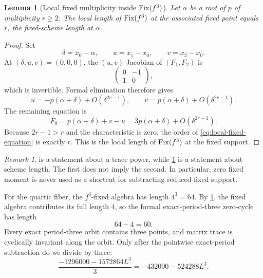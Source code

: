 \documentclass[11pt]{article}
\newtheorem{lemma}[theorem]{Lemma}
\theoremstyle{definition}
\theoremstyle{remark}
\newtheorem{remark}[theorem]{Remark}
\begin{document}
\begin{lemma}[Local fixed multiplicity inside \texorpdfstring{\(\operatorname{Fix}(f^3)\)}{Fix(f3)}]
\label{lem:fixed-multiplicity}
Let \(\alpha\) be a root of \(p\) of multiplicity \(r\ge2\).  The local
length of \(\operatorname{Fix}(f^3)\) at the associated fixed point equals \(r\), the
fixed-scheme length at \(\alpha\).
\end{lemma}

\begin{proof}
Set
\[
\delta=x_0-\alpha,
\qquad
u=x_1-x_0,
\qquad
v=x_2-x_0.
\]
At \((\delta,u,v)=(0,0,0)\), the \((u,v)\)-Jacobian of \((F_1,F_2)\) is
\[
\begin{pmatrix}0&-1\\1&0\end{pmatrix},
\]
which is invertible.  Formal elimination therefore gives
\[
u=-p(\alpha+\delta)+O(\delta^{2r-1}),
\qquad
v=p(\alpha+\delta)+O(\delta^{2r-1}).
\]
The remaining equation is
\begin{equation}
F_0=p(\alpha+\delta)+v-u
=3p(\alpha+\delta)+O(\delta^{2r-1}).
\label{eq:local-fixed-equation}
\end{equation}
Because \(2r-1>r\) and the characteristic is zero, the order of
\eqref{eq:local-fixed-equation} is exactly \(r\).  This is the local length
of \(\operatorname{Fix}(f^3)\) at the fixed support.
\end{proof}

\begin{remark}
 is a statement about a trace power, while
\cref{lem:fixed-multiplicity} is a statement about scheme length.  The first
does not imply the second.  In particular, zero fixed moment is never used as
a shortcut for subtracting reduced fixed support.
\end{remark}

For the quartic fiber, the \(f^3\)-fixed algebra has length \(4^3=64\).
By \cref{lem:fixed-multiplicity}, the fixed algebra contributes its full
length \(4\), so the formal exact-period-three zero-cycle has length
\begin{equation}
64-4=60.
\label{eq:exact-length-60}
\end{equation}
Every exact period-three orbit contains three points, and matrix trace is
cyclically invariant along the orbit.  Only after the pointwise exact-period
subtraction do we divide by three:
\begin{equation}
\frac{-1296000-1572864L^3}{3}
=-432000-524288L^3.
\label{eq:cyclewise-moment}
\end{equation}
\end{document}
